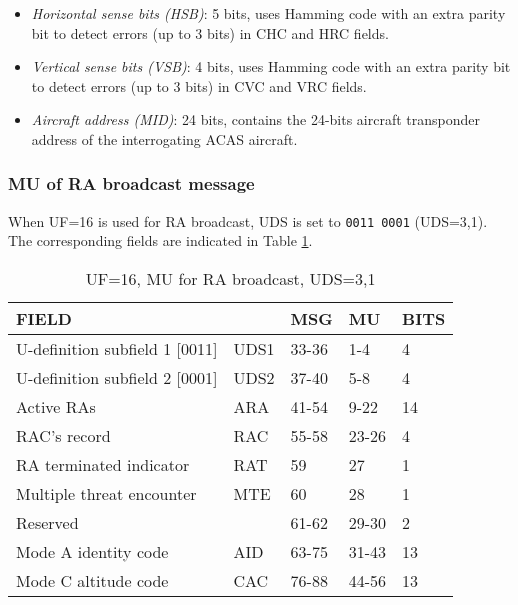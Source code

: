 \begin{itemize}
  \item \emph{Horizontal sense bits (HSB)}: 5 bits, uses Hamming code with an extra parity bit to detect errors (up to 3 bits) in CHC and HRC fields.

  \item \emph{Vertical sense bits (VSB)}: 4 bits, uses Hamming code with an extra parity bit to detect errors (up to 3 bits) in CVC and VRC fields.

  \item \emph{Aircraft address (MID)}: 24 bits, contains the 24-bits aircraft transponder address of the interrogating ACAS aircraft.

\end{itemize}



\subsubsection{MU of RA broadcast message} \label{sec:acas_ra}

When UF=16 is used for RA broadcast, UDS is set to \texttt{0011 0001} (UDS=3,1). The corresponding fields are indicated in Table \ref{tb:acas_mu_uds31}.

\begin{table}[ht]
\caption{UF=16, MU for RA broadcast, UDS=3,1}
\label{tb:acas_mu_uds31}
\begin{tabular}{|l|l|l|l|l|}
\hline
\textbf{FIELD} & \textbf{} & \textbf{MSG} & \textbf{MU} & \textbf{BITS} \\ \hline
U-definition subfield 1 [0011] & UDS1 & 33-36 & 1-4 & 4 \\ \hline
U-definition subfield 2 [0001] & UDS2 & 37-40 & 5-8 & 4 \\ \hline
Active RAs & ARA & 41-54 & 9-22 & 14 \\ \hline
RAC's record & RAC & 55-58 & 23-26 & 4 \\ \hline
RA terminated indicator & RAT & 59 & 27 & 1 \\ \hline
Multiple threat encounter & MTE & 60 & 28 & 1 \\ \hline
Reserved &  & 61-62 & 29-30 & 2 \\ \hline
Mode A identity code & AID & 63-75 & 31-43 & 13 \\ \hline
Mode C altitude code & CAC & 76-88 & 44-56 & 13 \\ \hline
\end{tabular}
\end{table}

